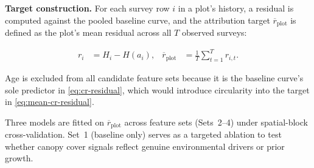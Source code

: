 \textbf{Target construction.}
For each survey row $i$ in a plot's history, a residual is computed against the pooled baseline curve, and the attribution target $\overline{r}_{\text{plot}}$ is defined as the plot's mean residual across all $T$ observed surveys:

\begin{subequations}
\label{eq:target-construction}
\begin{align}
r_i &= H_i - H(a_i), \label{eq:cr-residual} &
\overline{r}_{\text{plot}} &= \frac{1}{T}\sum_{t=1}^{T} r_{i,t}. \label{eq:mean-cr-residual}
\end{align}
\end{subequations}

Age is excluded from all candidate feature sets because it is the baseline curve's sole predictor in \eqref{eq:cr-residual}, which would introduce circularity into the target in \eqref{eq:mean-cr-residual}.

Three models are fitted on $\overline{r}_{\text{plot}}$ across feature sets (Sets~2--4) under spatial-block cross-validation. Set~1 (baseline only) serves as a targeted ablation to test whether canopy cover signals reflect genuine environmental drivers or prior growth.

